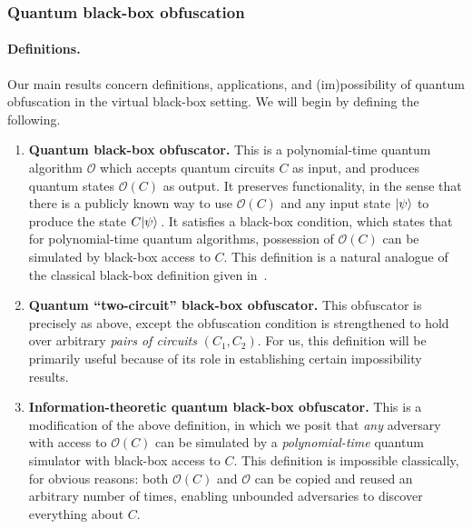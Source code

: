 \documentclass[11pt]{article}
\numberwithin{equation}{section}
\newcommand{\algo}{\mathcal}
\begin{document}
{\subsubsection{Quantum black-box obfuscation}

\paragraph{Definitions.} Our main results concern definitions, applications, and (im)possibility of quantum obfuscation in the virtual black-box setting. We will begin by defining the following.

\begin{enumerate}
\item \textbf{Quantum black-box obfuscator.} This is a polynomial-time quantum algorithm $\algo O$ which accepts quantum circuits $C$ as input, and produces quantum states $\algo O(C)$ as output. It preserves functionality, in the sense that there is a publicly known way to use $\algo O(C)$ and any input state ${\left\vert{\psi}\right\rangle}$ to produce the state $C {\left\vert{\psi}\right\rangle}$\,. It satisfies a black-box condition, which states that for polynomial-time quantum algorithms, possession of $\algo O(C)$ can be simulated by black-box access to $C$. This definition is a natural analogue of the classical black-box definition given in~\cite{BGIRSVY12}.
\item \textbf{Quantum ``two-circuit'' black-box obfuscator.} This obfuscator is precisely as above, except the obfuscation condition is strengthened to hold over arbitrary \emph{pairs of circuits} $(C_1, C_2)$. For us, this definition will be primarily useful because of its role in establishing certain impossibility results.
\item \textbf{Information-theoretic quantum black-box obfuscator.} This is a modification of the above definition, in which we posit that \emph{any} adversary with access to $\algo O(C)$ can be simulated by a \emph{polynomial-time} quantum simulator with black-box access to $C$. This definition is impossible classically, for obvious reasons: both $\algo O(C)$  and $\algo O$ can be copied and reused an arbitrary number of times, enabling unbounded adversaries to discover everything about $C$.
\end{enumerate}

}
\end{document}
